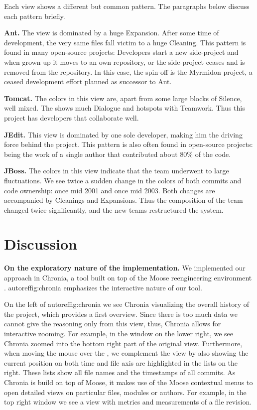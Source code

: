 Each view shows a different but common pattern. The paragraphs below discuss each pattern briefly.

\textbf{Ant.} The view is dominated by a huge Expansion. After some time of development, the very same files fall victim to a huge Cleaning. This pattern is found in many open-source projects: Developers start a new side-project and when grown up it moves to an own repository, or the side-project ceases and is removed from the repository. In this case, the spin-off is the Myrmidon project, a ceased development effort planned as successor to Ant.

\textbf{Tomcat.} The colors in this view are, apart from some large blocks of Silence, well mixed. The \omap shows much Dialogue and hotspots with Teamwork. Thus this project has developers that  collaborate well.

\textbf{JEdit.} This view is dominated by one sole developer, making him the driving force behind the project. This pattern is also often found in open-source projects: being the work of a single author that contributed about 80\% of the code.

\textbf{JBoss.} The colors in this view indicate that the team underwent to large fluctuations. We see twice a sudden change in the colors of both commits and code ownership: once mid 2001 and once mid 2003. Both changes are accompanied by Cleanings and Expansions. Thus the composition of the team changed twice significantly, and the new teams restructured the system.

\section{Discussion}\label{sec:discussion}

\textbf{On the exploratory nature of the implementation.} We implemented our approach in Chronia, a tool built on top of the Moose reengineering environment \cite{Duca05a}. autoref{fig:chronia} emphasizes the interactive nature of our tool.

On the left of autoref{fig:chronia} we see Chronia visualizing the overall history of the project, which provides a first overview. Since there is too much data we cannot give the reasoning only from this view, thus, Chronia allows for interactive zooming. For example, in the window on the lower right, we see Chronia zoomed into the bottom right part of the original view. Furthermore, when moving the mouse over the \omap, we complement the view by also showing the current position on both time and file axis are highlighted in the lists on the right. These lists show all file names and the timestamps of all commits. As Chronia is build on top of Moose, it makes use of the Moose contextual menus to open detailed views on particular files, modules or authors. For example, in the top right window we see a view with metrics and measurements of a file revision.

